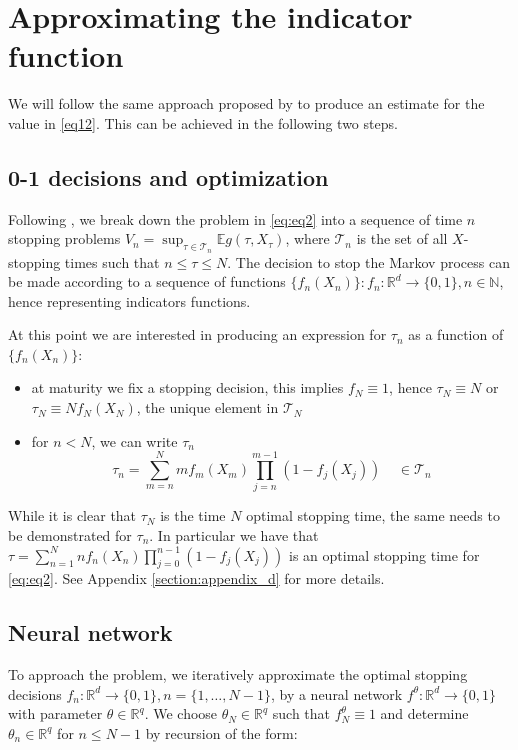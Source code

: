 \documentclass{article}
\begin{document}
\section{Approximating the indicator function}
We will follow the same approach proposed by \cite{becker2019deep} to produce an estimate for the value in \ref{eq12}. This can be achieved in the following two steps.

\subsection{0-1 decisions and optimization}
Following \cite{becker2019deep}, we break down the problem in \ref{eq:eq2} into a sequence of time $n$ stopping problems $V_n = \sup_{\tau \in \mathcal{T}_n} \mathbb{E} g(\tau, X_{\tau})$, where $\mathcal{T}_n$ is the set of all $X$-stopping times such that $n \leq \tau \leq N$. The decision to stop the Markov process can be made according to a sequence of functions $\{f_n(X_n)\}: f_n: \mathbb{R}^d \rightarrow \{0, 1 \}, n \in \mathbb{N}$, hence representing indicators functions.

At this point we are interested in producing an expression for $\tau_n$ as a function of $\{f_n(X_n)\}$:
\begin{itemize}
    \item at maturity we fix a stopping decision, this implies $f_N \equiv 1$, hence $\tau_N \equiv N$ or $\tau_N \equiv N f_N(X_N)$, the unique element in $\mathcal{T}_N$
    \item for $n < N$, we can write $\tau_n$ 
    \begin{equation}\label{eq13}
        \tau_n = \sum_{m=n}^N m f_m(X_m) \prod_{j=n}^{m-1} (1-f_j(X_j)) \;\;\;\; \in \mathcal{T}_n
    \end{equation}
\end{itemize}
While it is clear that $\tau_N$ is the time $N$ optimal stopping time, the same needs to be demonstrated for $\tau_n$. In particular we have that $\tau = \sum_{n=1}^N n f_n(X_n) \prod_{j=0}^{n-1} (1-f_j(X_j))$ is an optimal stopping time for \ref{eq:eq2}. See Appendix \ref{section:appendix_d} for more details.


\subsection{Neural network}
To approach the problem, we iteratively approximate the optimal stopping decisions $f_n: \mathbb{R}^d \rightarrow \{0, 1 \}, n = \{ 1, \ldots, N-1 \}$, by a neural network $f^{\theta}: \mathbb{R}^d \rightarrow \{0, 1 \}$ with parameter $\theta \in \mathbb{R}^q$. We choose $\theta_N \in \mathbb{R}^q$ such that $f^{\theta}_N \equiv 1$ and determine $\theta_n \in \mathbb{R}^q$ for $n \leq N-1$ by recursion of the form:
\end{document}
